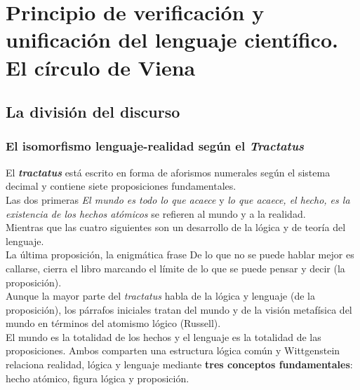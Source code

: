 \documentclass[a4paper, 11pt, twocolumn, spanish]{article}
\begin{document}
\section{Principio de verificación y unificación del lenguaje científico. El círculo de Viena}
\label{sec:orgd61404a}
\subsection{La división del discurso}
\label{sec:org47715ad}
\subsubsection{El isomorfismo lenguaje-realidad según el \emph{Tractatus}}
\label{sec:org7a7cc1c}
El \textbf{\emph{tractatus}} está escrito en forma de aforismos numerales según el
sistema decimal y contiene siete proposiciones fundamentales.\\[0pt]
Las dos primeras \emph{El mundo es todo lo que acaece} y \emph{lo que acaece, el
hecho, es la existencia de los hechos atómicos} se refieren al mundo y
a la realidad.\\[0pt]
Mientras que las cuatro siguientes son un desarrollo de la lógica y de
teoría del lenguaje.\\[0pt]
La última proposición, la enigmática frase De lo que no se puede
hablar mejor es callarse, cierra el libro marcando el límite de lo que
se puede pensar y decir (la proposición).\\[0pt]
Aunque la mayor parte del \emph{tractatus} habla de la lógica y lenguaje (de
la proposición), los párrafos iniciales tratan del mundo y de la
visión metafísica del mundo en términos del atomismo lógico
(Russell).\\[0pt]
El mundo es la totalidad de los hechos y el lenguaje es la totalidad
de las proposiciones. Ambos comparten una estructura lógica común y
Wittgenstein relaciona realidad, lógica y lenguaje mediante \textbf{tres
conceptos fundamentales}: hecho atómico, figura lógica y
proposición.\\[0pt]
\end{document}
